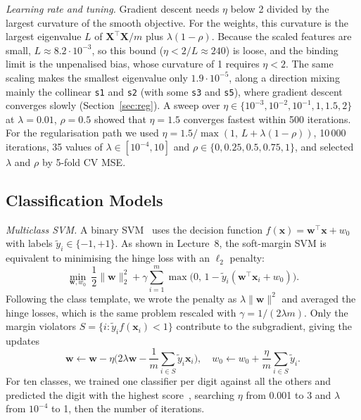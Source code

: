 \documentclass[conference]{IEEEtran}
\newcommand{\vect}[1]{\mathbf{#1}}
\begin{document}
\textit{Learning rate and tuning.} Gradient descent needs $\eta$ below 2 divided by the largest curvature of the smooth objective. For the weights, this curvature is the largest eigenvalue $L$ of $\vect{X}^\top\vect{X}/m$ plus $\lambda(1-\rho)$. Because the scaled features are small, $L\approx8.2\cdot10^{-3}$, so this bound ($\eta<2/L\approx240$) is loose, and the binding limit is the unpenalised bias, whose curvature of 1 requires $\eta<2$. The same scaling makes the smallest eigenvalue only $1.9\cdot10^{-5}$, along a direction mixing mainly the collinear \texttt{s1} and \texttt{s2} (with some \texttt{s3} and \texttt{s5}), where gradient descent converges slowly (Section~\ref{sec:reg}). A sweep over $\eta\in\{10^{-3},10^{-2},10^{-1},1,1.5,2\}$ at $\lambda=0.01$, $\rho=0.5$ showed that $\eta=1.5$ converges fastest within 500 iterations. For the regularisation path we used $\eta=1.5/\max(1,\,L+\lambda(1-\rho))$, 10\,000 iterations, 35 values of $\lambda\in[10^{-4},10]$ and $\rho\in\{0,0.25,0.5,0.75,1\}$, and selected $\lambda$ and $\rho$ by 5-fold CV MSE\@.

\subsection{Classification Models}
\textit{Multiclass SVM.} A binary SVM~\cite{cortes} uses the decision function $f(\vect{x})=\vect{w}^\top\vect{x}+w_0$ with labels $\tilde y_i\in\{-1,+1\}$. As shown in Lecture~8, the soft-margin SVM is equivalent to minimising the hinge loss with an $\ell_2$ penalty:
\begin{equation}
\min_{\vect{w},w_0}\ \frac12\|\vect{w}\|_2^2+\gamma\sum_{i=1}^{m}\max\big(0,\,1-\tilde y_i(\vect{w}^\top\vect{x}_i+w_0)\big).
\label{eq:hinge}
\end{equation}
Following the class template, we wrote the penalty as $\lambda\|\vect{w}\|^2$ and averaged the hinge losses, which is the same problem rescaled with $\gamma=1/(2\lambda m)$. Only the margin violators $S=\{i:\tilde y_i f(\vect{x}_i)<1\}$ contribute to the subgradient, giving the updates
\begin{equation}
\vect{w}\leftarrow\vect{w}-\eta\Big(2\lambda\vect{w}-\frac1m\sum_{i\in S}\tilde y_i\vect{x}_i\Big),\quad w_0\leftarrow w_0+\frac{\eta}{m}\sum_{i\in S}\tilde y_i .
\end{equation}
For ten classes, we trained one classifier per digit against all the others and predicted the digit with the highest score~\cite{notes}, searching $\eta$ from 0.001 to 3 and $\lambda$ from $10^{-4}$ to 1, then the number of iterations.
\end{document}
